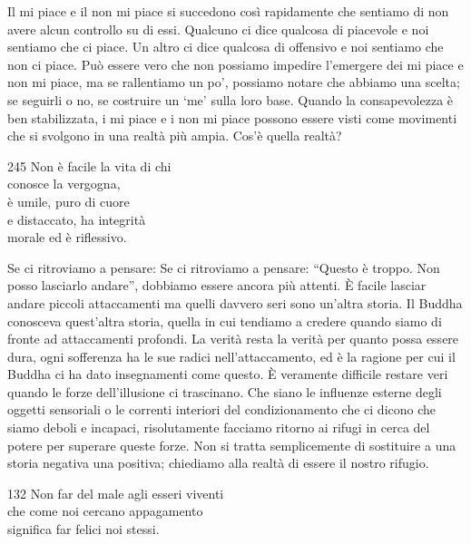 \begin{dhpRefl}
  Il mi piace e il non mi piace si succedono così rapidamente che sentiamo di
  non avere alcun controllo su di essi. Qualcuno ci dice qualcosa di piacevole e
  noi sentiamo che ci piace. Un altro ci dice qualcosa di offensivo e noi
  sentiamo che non ci piace. Può essere vero che non possiamo impedire
  l'emergere dei mi piace e non mi piace, ma se rallentiamo un po', possiamo
  notare che abbiamo una scelta; se seguirli o no, se costruire un `me' sulla
  loro base. Quando la consapevolezza è ben stabilizzata, i mi piace e i non mi
  piace possono essere visti come movimenti che si svolgono in una realtà più
  ampia. Cos'è quella realtà?
\end{dhpRefl}


\begin{dhpVerse}{245}
\label{dhp-245}
Non è facile la vita di chi\\
conosce la vergogna,\\
è umile, puro di cuore\\
e distaccato, ha integrità\\
morale ed è riflessivo.
\end{dhpVerse}

\begin{dhpRefl}
  Se ci ritroviamo a pensare: Se ci ritroviamo a pensare: ``Questo è troppo. Non
  posso lasciarlo andare'', dobbiamo essere ancora più attenti. È facile lasciar
  andare piccoli attaccamenti ma quelli davvero seri sono un'altra storia. Il
  Buddha conosceva quest'altra storia, quella in cui tendiamo a credere quando
  siamo di fronte ad attaccamenti profondi. La verità resta la verità per quanto
  possa essere dura, ogni sofferenza ha le sue radici nell'attaccamento, ed è la
  ragione per cui il Buddha ci ha dato insegnamenti come questo. È veramente
  difficile restare veri quando le forze dell'illusione ci trascinano. Che siano
  le influenze esterne degli oggetti sensoriali o le correnti interiori del
  condizionamento che ci dicono che siamo deboli e incapaci, risolutamente
  facciamo ritorno ai rifugi in cerca del potere per superare queste forze. Non
  si tratta semplicemente di sostituire a una storia negativa una positiva;
  chiediamo alla realtà di essere il nostro rifugio.
\end{dhpRefl}


\begin{dhpVerse}{132}
\label{dhp-132}
Non far del male agli esseri viventi\\
che come noi cercano appagamento\\
significa far felici noi stessi.
\end{dhpVerse}

